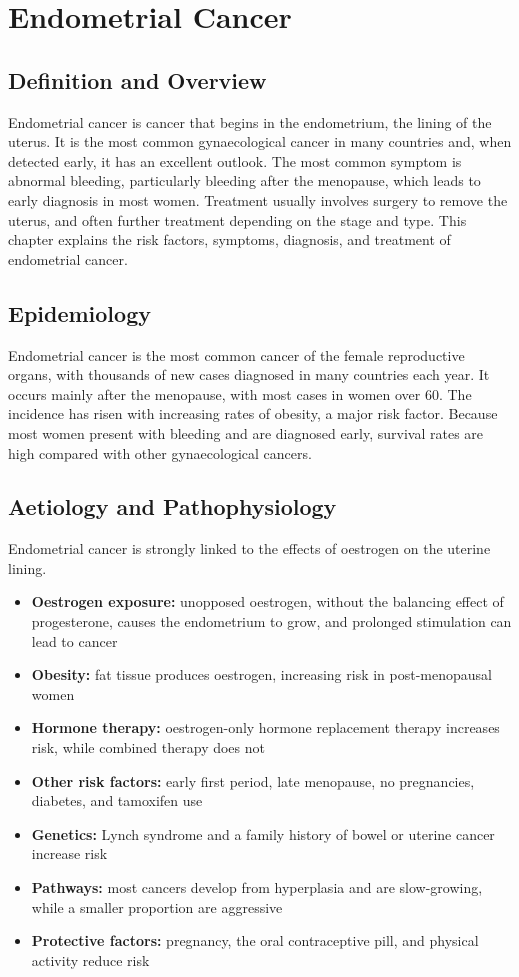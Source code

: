 \chapter{Endometrial Cancer}

\section*{Definition and Overview}
Endometrial cancer is cancer that begins in the endometrium, the lining of the uterus. It is the most common gynaecological cancer in many countries and, when detected early, it has an excellent outlook. The most common symptom is abnormal bleeding, particularly bleeding after the menopause, which leads to early diagnosis in most women. Treatment usually involves surgery to remove the uterus, and often further treatment depending on the stage and type. This chapter explains the risk factors, symptoms, diagnosis, and treatment of endometrial cancer.

\section*{Epidemiology}
Endometrial cancer is the most common cancer of the female reproductive organs, with thousands of new cases diagnosed in many countries each year. It occurs mainly after the menopause, with most cases in women over 60. The incidence has risen with increasing rates of obesity, a major risk factor. Because most women present with bleeding and are diagnosed early, survival rates are high compared with other gynaecological cancers.

\section*{Aetiology and Pathophysiology}
Endometrial cancer is strongly linked to the effects of oestrogen on the uterine lining.
\begin{itemize}
    \item \textbf{Oestrogen exposure:} unopposed oestrogen, without the balancing effect of progesterone, causes the endometrium to grow, and prolonged stimulation can lead to cancer
    \item \textbf{Obesity:} fat tissue produces oestrogen, increasing risk in post-menopausal women
    \item \textbf{Hormone therapy:} oestrogen-only hormone replacement therapy increases risk, while combined therapy does not
    \item \textbf{Other risk factors:} early first period, late menopause, no pregnancies, diabetes, and tamoxifen use
    \item \textbf{Genetics:} Lynch syndrome and a family history of bowel or uterine cancer increase risk
    \item \textbf{Pathways:} most cancers develop from hyperplasia and are slow-growing, while a smaller proportion are aggressive
    \item \textbf{Protective factors:} pregnancy, the oral contraceptive pill, and physical activity reduce risk
\end{itemize}

